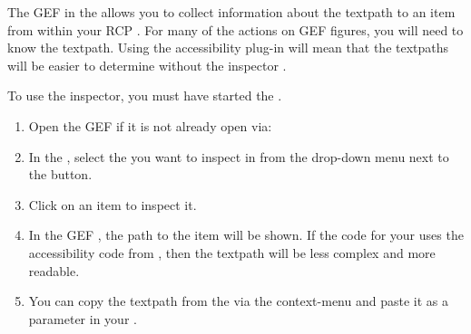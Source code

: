
The GEF \gdinspector in  the \ite{} allows you to collect information about the textpath to an item from within your RCP \gdaut{}. For many of the actions on GEF figures, you will need to know the textpath. Using the \app{} accessibility plug-in will mean that the textpaths will be easier to determine without the inspector . 

To use the inspector, you must have started the \gdaut{} . 
\begin{enumerate}
\item Open the GEF \gdinspector{} if it is not already open via:\\
\item In the \gdinspector{}, select the \gdaut{} you want to inspect in from the drop-down menu next to the  button. 
\item Click on an item to inspect it.
\item In the GEF \gdinspector{}, the path to the item will be shown. If the code for your \gdaut{} uses the accessibility code from \app{}, then the textpath will be less complex and more readable. 
\item You can copy the textpath from the \gdinspector{} via the context-menu and paste it as a parameter in your \gdcases{}. 
\end{enumerate}
